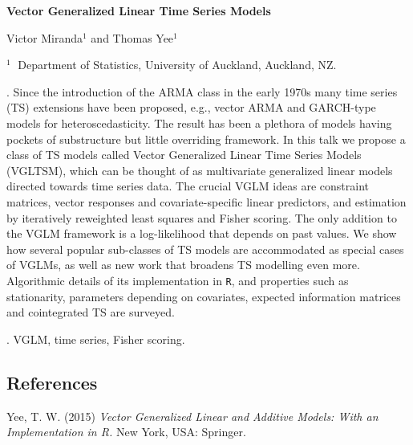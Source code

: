 \documentclass[12pt]{article}
\begin{document}
\begin{flushleft}


\begin{center}
    {\Large\bf Vector Generalized Linear Time Series Models}
\end{center}

\vspace{1.0cm}

Victor Miranda$^1$ and Thomas Yee$^1$

\begin{description}

\item $^1 \;$ Department of Statistics, University of Auckland,
Auckland, NZ.


\end{description}

\end{flushleft}

\vspace{0.75cm}

. 
Since the introduction of the ARMA class in the early 1970s many
time series (TS) extensions have been proposed, e.g., vector ARMA
and GARCH-type models for heteroscedasticity. The result has been
a plethora of models having pockets of substructure but little
overriding framework. In this talk we propose a class of TS models
called Vector Generalized Linear Time Series Models (VGLTSM),
which can be thought of as multivariate generalized linear models
directed towards time series data. The crucial VGLM ideas are
constraint matrices, vector responses and covariate-specific
linear predictors, and estimation by iteratively reweighted
least squares and Fisher scoring. The only addition to the VGLM
framework is a log-likelihood that depends on past values. We show
how several popular sub-classes of TS models are accommodated
as special cases of VGLMs, as well as new work that broadens TS
modelling even more. Algorithmic details of its implementation
in {\large \tt{R}}, and properties such as stationarity, parameters
depending on covariates, expected information matrices and
cointegrated TS are surveyed.

\vskip 2mm

.
VGLM, time series, Fisher scoring.




\subsection*{References}


\begin{description}

\item
Yee, T. W. (2015) 
\textit{Vector Generalized Linear and Additive Models: With an
Implementation in R.} New York, USA: Springer.

\end{description}
\end{document}
